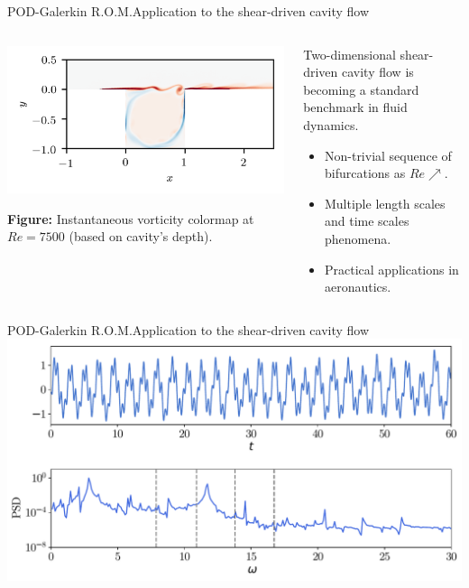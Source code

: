\documentclass[usenames,dvipsnames,svgnames,10pt,aspectratio=169]{beamer}
\begin{document}
\begin{frame}[t, c]{POD-Galerkin R.O.M.}{Application to the shear-driven cavity flow}
	\begin{columns}
		\begin{column}{.45\textwidth}
			\begin{center}
				\includegraphics[width=\textwidth]{shear-driven-cavity}
			\end{center}
			\textbf{Figure:} Instantaneous vorticity colormap at $Re=7500$ (based on cavity's depth).
		\end{column}
		\begin{column}{.55\textwidth}
			Two-dimensional shear-driven cavity flow is becoming a standard benchmark in fluid dynamics.
			\medskip
			\begin{itemize}
				\item Non-trivial sequence of bifurcations as $Re \nearrow$.
				\medskip
				\item Multiple length scales and time scales phenomena.
				\medskip
				\item Practical applications in aeronautics.
			\end{itemize}
			\vspace{1cm}
		\end{column}
	\end{columns}
\end{frame}

\begin{frame}[t, c]{POD-Galerkin R.O.M.}{Application to the shear-driven cavity flow}
	\centering
	\includegraphics[width=.75\textwidth]{energy_psd}

	\vspace{1cm}
\end{frame}
\end{document}

